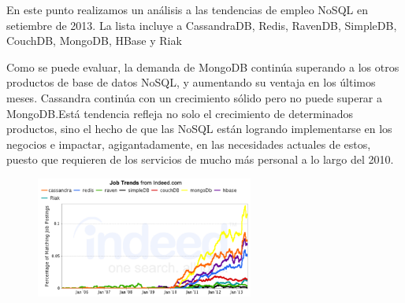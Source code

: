 \documentclass[12pt]{article}
\begin{document}
\begin{multicols}{2}
\vspace{\baselineskip}
{\fontsize{9pt}{10.8pt}\selectfont En este punto realizamos un análisis a las tendencias de empleo NoSQL en setiembre de 2013. La lista incluye a CassandraDB, Redis, RavenDB, SimpleDB, CouchDB, MongoDB, HBase y Riak\par}\par

{\fontsize{9pt}{10.8pt}\selectfont Como se puede evaluar, la demanda de MongoDB continúa superando a los otros productos de base de datos NoSQL, y aumentando su ventaja en los últimos meses. Cassandra continúa con un crecimiento sólido pero no puede superar a MongoDB.Está tendencia refleja no solo el crecimiento de determinados productos, sino el hecho de que las NoSQL están logrando implementarse en los negocios e impactar, agigantadamente, en las necesidades actuales de estos, puesto que requieren de los servicios de mucho más personal a lo largo del 2010.\par}\par




\begin{figure}[H]
	\begin{Center}
		\includegraphics[width=2.81in,height=1.57in]{./media/image9.png}
	\end{Center}
\end{figure}



{\fontsize{10pt}{12.0pt}\selectfont \par}\par


\vspace{\baselineskip}

\vspace{\baselineskip}

\vspace{\baselineskip}


\end{multicols}
\end{document}
